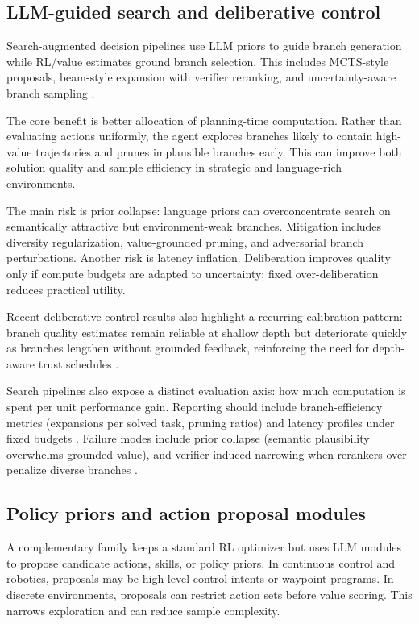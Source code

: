 ﻿\documentclass[conference]{IEEEtran}
\begin{document}
\subsection{LLM-guided search and deliberative control}
Search-augmented decision pipelines use LLM priors to guide branch generation while RL/value estimates ground branch selection. This includes MCTS-style proposals, beam-style expansion with verifier reranking, and uncertainty-aware branch sampling \cite{arxiv_p_2602_03719,arxiv_p_2602_06493,arxiv_p_2602_07848,doi_p_10_48448_q4pk_2g71}.

The core benefit is better allocation of planning-time computation. Rather than evaluating actions uniformly, the agent explores branches likely to contain high-value trajectories and prunes implausible branches early. This can improve both solution quality and sample efficiency in strategic and language-rich environments.

The main risk is prior collapse: language priors can overconcentrate search on semantically attractive but environment-weak branches. Mitigation includes diversity regularization, value-grounded pruning, and adversarial branch perturbations. Another risk is latency inflation. Deliberation improves quality only if compute budgets are adapted to uncertainty; fixed over-deliberation reduces practical utility.

Recent deliberative-control results also highlight a recurring calibration pattern: branch quality estimates remain reliable at shallow depth but deteriorate quickly as branches lengthen without grounded feedback, reinforcing the need for depth-aware trust schedules \cite{arxiv_p_2601_06845,arxiv_p_2602_03719,arxiv_p_2602_06493}.

Search pipelines also expose a distinct evaluation axis: how much computation is spent per unit performance gain. Reporting should include branch-efficiency metrics (expansions per solved task, pruning ratios) and latency profiles under fixed budgets \cite{arxiv_p_2602_07848,doi_p_10_48448_q4pk_2g71,arxiv_p_2602_14234}. Failure modes include prior collapse (semantic plausibility overwhelms grounded value), and verifier-induced narrowing when rerankers over-penalize diverse branches \cite{arxiv_p_2602_06493,arxiv_p_2602_02395,arxiv_p_2602_11551}.

\subsection{Policy priors and action proposal modules}
A complementary family keeps a standard RL optimizer but uses LLM modules to propose candidate actions, skills, or policy priors. In continuous control and robotics, proposals may be high-level control intents or waypoint programs. In discrete environments, proposals can restrict action sets before value scoring. This narrows exploration and can reduce sample complexity.
\end{document}
